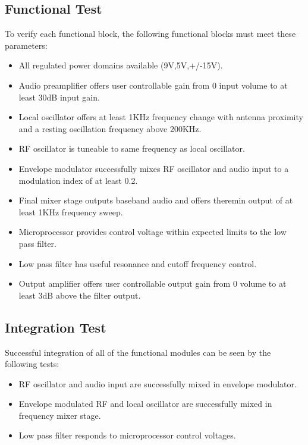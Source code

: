 \documentclass[a4paper,12pt]{article}
\begin{document}
	\subsection{Functional Test}
    To verify each functional block, the following functional blocks must meet these parameters:\\
    \begin{itemize}
        \item All regulated power domains available (9V,5V,+/-15V).
        \item Audio preamplifier offers user controllable gain from 0 input volume to at least 30dB input gain.
        \item Local oscillator offers at least 1KHz frequency change with antenna proximity and a resting oscillation frequency above 200KHz.
        \item RF oscillator is tuneable to same frequency as local oscillator.
        \item Envelope modulator successfully mixes RF oscillator and audio input to a modulation index of at least 0.2.
        \item Final mixer stage outputs baseband audio and offers theremin output of at least 1KHz frequency sweep.
        \item Microprocessor provides control voltage within expected limits to the low pass filter.
        \item Low pass filter has useful resonance and cutoff frequency control.
        \item Output amplifier offers user controllable output gain from 0 volume to at least 3dB above the filter output.
    \end{itemize}
    \subsection{Integration Test}
    Successful integration of all of the functional modules can be seen by the following tests:
    \begin{itemize}
        \item RF oscillator and audio input are successfully mixed in envelope modulator.
        \item Envelope modulated RF and local oscillator are successfully mixed in frequency mixer stage.
        \item Low pass filter responds to microprocessor control voltages.
    \end{itemize}
\end{document}
